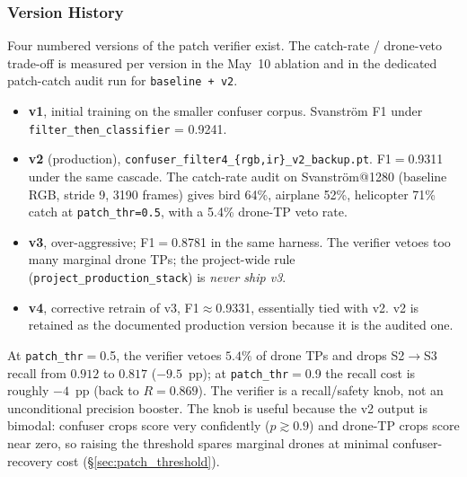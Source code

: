 \subsubsection{Version History}

Four numbered versions of the patch verifier exist. The catch-rate / drone-veto trade-off is measured per version in the May~10 ablation and in the dedicated patch-catch audit run for \texttt{baseline + v2}.

\begin{itemize}
    \item \textbf{v1}, initial training on the smaller confuser corpus. Svanstr\"om F1 under \texttt{filter\_then\_classifier} = 0.9241.
    \item \textbf{v2} (production), \texttt{confuser\_filter4\_\{rgb,ir\}\_v2\_backup.pt}. F1$=$0.9311 under the same cascade. The catch-rate audit on Svanstr\"om@1280 (baseline RGB, stride 9, 3190 frames) gives bird 64\%, airplane 52\%, helicopter 71\% catch at \texttt{patch\_thr=0.5}, with a 5.4\% drone-TP veto rate.
    \item \textbf{v3}, over-aggressive; F1$=$0.8781 in the same harness. The verifier vetoes too many marginal drone TPs; the project-wide rule (\texttt{project\_production\_stack}) is \emph{never ship v3}.
    \item \textbf{v4}, corrective retrain of v3, F1$\approx$0.9331, essentially tied with v2. v2 is retained as the documented production version because it is the audited one.
\end{itemize}

At \texttt{patch\_thr}$=$0.5, the verifier vetoes $5.4\%$ of drone TPs and drops S2$\to$S3 recall from $0.912$ to $0.817$ ($-9.5$~pp); at \texttt{patch\_thr}$=$0.9 the recall cost is roughly $-4$~pp (back to $R=0.869$). The verifier is a recall/safety knob, not an unconditional precision booster. The knob is useful because the v2 output is bimodal: confuser crops score very confidently ($p \gtrsim 0.9$) and drone-TP crops score near zero, so raising the threshold spares marginal drones at minimal confuser-recovery cost (\S\ref{sec:patch_threshold}).

